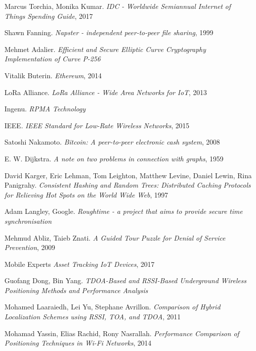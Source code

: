 \documentclass[10pt, nonatbib, nocopyrightspace, reprint]{sigplanconf}
\begin{document}
\begin{thebibliography}{10}
\softraggedright

    Marcus Torchia, Monika Kumar. 
    \emph{IDC - Worldwide Semiannual Internet of Things Spending Guide}, 2017

    Shawn Fanning.
    \emph{Napster - independent peer-to-peer file sharing}, 1999

    Mehmet Adalier.
    \emph{Efficient and Secure Elliptic Curve Cryptography Implementation of Curve P-256}

    Vitalik Buterin.
    \emph{Ethereum}, 2014

    LoRa Alliance.
    \emph{LoRa Alliance - Wide Area Networks for IoT}, 2013

    Ingenu.
    \emph{RPMA Technology}

    IEEE.
    \emph{IEEE Standard for Low-Rate Wireless Networks}, 2015

    Satoshi Nakamoto.
    \emph{Bitcoin: A peer-to-peer electronic cash system}, 2008

    E. W. Dijkstra.
    \emph{A note on two problems in connection with graphs}, 1959

    David Karger, Eric Lehman, Tom Leighton, Matthew Levine, Daniel Lewin, Rina Panigrahy.
    \emph{Consistent Hashing and Random Trees: Distributed Caching Protocols for Relieving Hot Spots on the World Wide Web}, 1997

    Adam Langley, Google.
    \emph{Roughtime - a project that aims to provide secure time synchronisation}

    Mehmud Abliz, Taieb Znati.
    \emph{A Guided Tour Puzzle for Denial of Service Prevention}, 2009

    Mobile Experts
    \emph{Asset Tracking IoT Devices}, 2017

    Guofang Dong, Bin Yang.
    \emph{TDOA-Based and RSSI-Based Underground Wireless Positioning Methods and Performance Analysis}

    Mohamed Laaraiedh, Lei Yu, Stephane Avrillon.
    \emph{Comparison of Hybrid Localization Schemes using RSSI, TOA, and TDOA}, 2011

    Mohamad Yassin, Elias Rachid, Rony Nasrallah.
    \emph{Performance Comparison of Positioning Techniques in Wi-Fi Networks}, 2014


\end{thebibliography}
\end{document}
